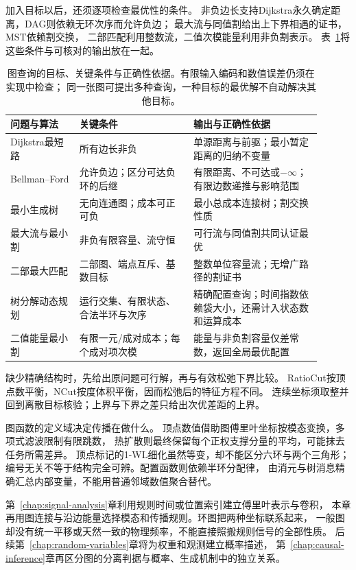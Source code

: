 加入目标以后，还须逐项检查最优性的条件。
非负边长支持Dijkstra永久确定距离，DAG则依赖无环次序而允许负边；
最大流与同值割给出上下界相遇的证书，MST依赖割交换，
二部匹配利用整数流，二值次模能量利用非负割表示。
表~\ref{tab:graph-algorithm-conditions}将这些条件与可核对的输出放在一起。

\begin{table}[htbp]
  \centering
  \caption{图查询的目标、关键条件与正确性依据。有限输入编码和数值误差仍须在实现中检查；
  同一张图可提出多种查询，一种目标的最优解不自动解决其他目标。}
  \label{tab:graph-algorithm-conditions}
  \begin{tabular}{p{0.20\linewidth}p{0.33\linewidth}p{0.37\linewidth}}
    \toprule
    问题与算法 & 关键条件 & 输出与正确性依据\\
    \midrule
    Dijkstra最短路 & 所有边长非负 & 单源距离与前驱；最小暂定距离的归纳不变量\\
    Bellman--Ford & 允许负边；区分可达负环的后继 & 有限距离、不可达或\(-\infty\)；
      有限边数递推与影响范围\\
    最小生成树 & 无向连通图；成本可正可负 & 最小总成本连接树；割交换性质\\
    最大流与最小割 & 非负有限容量、流守恒 & 可行流与同值割共同认证最优\\
    二部最大匹配 & 二部图、端点互斥、基数目标 & 整数单位容量流；无增广路径的割证书\\
    树分解动态规划 & 运行交集、有限状态、合法半环与次序 &
      精确配置查询；时间指数依赖袋大小，还需计入状态数和运算成本\\
    二值能量最小割 & 有限一元/成对成本；每个成对项次模 &
      能量与非负割容量仅差常数，返回全局最优配置\\
    \bottomrule
  \end{tabular}
\end{table}

缺少精确结构时，先给出原问题可行解，再与有效松弛下界比较。
RatioCut按顶点数平衡，NCut按度体积平衡，因而松弛后的特征方程不同。
连续坐标须取整并回到离散目标核验；上界与下界之差只给出次优差距的上界。

图函数的定义域决定传播在做什么。
顶点数值借助图傅里叶坐标按模态变换，多项式滤波限制有限跳数，
热扩散则最终保留每个正权支撑分量的平均，可能抹去任务所需差异。
顶点标记的1-WL细化虽然等变，却不能区分六环与两个三角形；
编号无关不等于结构完全可辨。配置函数则依赖半环分配律，
由消元与树消息精确汇总内部变量，不能用普通邻域数值聚合替代。

第~\ref{chap:signal-analysis}章利用规则时间或位置索引建立傅里叶表示与卷积，
本章再用图连接与沿边能量选择模态和传播规则。环图把两种坐标联系起来，
一般图却没有统一平移或天然一致的物理频率，不能直接照搬规则信号的全部性质。
后续第~\ref{chap:random-variables}章将为权重和观测建立概率描述，
第~\ref{chap:causal-inference}章再区分图的分离判据与概率、生成机制中的独立关系。
